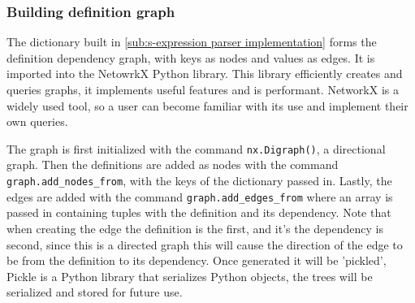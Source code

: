 
\subsubsection{Building definition graph}

The dictionary built in \cref{sub:s-expression parser implementation} forms the
definition dependency graph, with keys as nodes and values as edges. It is
imported into the NetowrkX Python library. This library efficiently creates and
queries graphs, it implements useful features and is performant. NetworkX is a
widely used tool, so a user can become familiar with its use and
implement their own queries. 

 The graph is
first initialized with the command \texttt{nx.Digraph()}, a directional graph.
Then the definitions are added as nodes with the command
\texttt{graph.add\_nodes\_from}, with the keys of the dictionary passed in.
Lastly, the edges are added with the command \texttt{graph.add\_edges\_from}
where an array is passed in containing tuples with the definition and its
dependency. Note that when creating the edge the definition is the first, and
it's the dependency is second, since this is a directed graph this will cause
the direction of the edge to be from the definition to its dependency.  Once
generated it will be 'pickled', Pickle is a Python library that serializes Python
objects, the trees will be serialized and stored for future use. 

